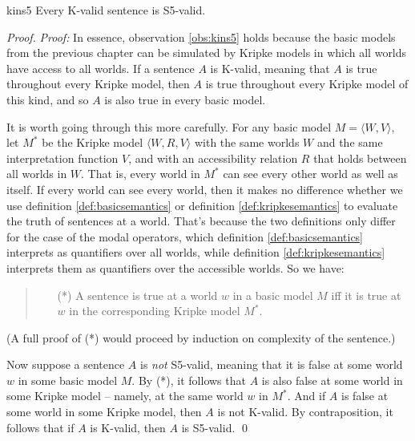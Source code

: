\begin{observation}{kins5}
  Every K-valid sentence is S5-valid.
\end{observation}
%
\begin{proof}
  \emph{Proof:} In essence, observation \ref{obs:kins5} holds because the basic
  models from the previous chapter can be simulated by Kripke models in which
  all worlds have access to all worlds. If a sentence $A$ is K-valid, meaning
  that $A$ is true throughout every Kripke model, then $A$ is true throughout
  every Kripke model of this kind, and so $A$ is also true in every basic model.

  It is worth going through this more carefully. For any basic model
  $M = \langle W,V \rangle$, let $M^*$ be the Kripke model
  $\langle W,R,V \rangle$ with the same worlds $W$ and the same interpretation
  function $V$, and with an accessibility relation $R$ that holds between all
  worlds in $W$. That is, every world in $M^*$ can see every other world as well
  as itself. If every world can see every world, then it makes no difference
  whether we use definition \ref{def:basicsemantics} or definition
  \ref{def:kripkesemantics} to evaluate the truth of sentences at a world.
  That's because the two definitions only differ for the case of the modal
  operators, which definition \ref{def:basicsemantics} interprets as quantifiers
  over all worlds, while definition \ref{def:kripkesemantics} interprets them as
  quantifiers over the accessible worlds. So we have:
  \begin{quote}
  \begin{itemize}
  \item[(*)] A sentence is true at a world $w$ in a basic model $M$ iff
    it is true at $w$ in the corresponding Kripke model $M^*$.
  \end{itemize}
  \end{quote}

  (A full proof of (*) would proceed by induction on complexity of the
  sentence.)

  Now suppose a sentence $A$ is \emph{not} S5-valid, meaning that it is false at
  some world $w$ in some basic model $M$. By (*), it follows that $A$ is also
  false at some world in some Kripke model -- namely, at the same world $w$ in
  $M^*$. And if $A$ is false at some world in some Kripke model, then $A$ is not
  K-valid. By contraposition, it follows that if $A$ is K-valid, then $A$ is
  S5-valid. \qed
\end{proof}

